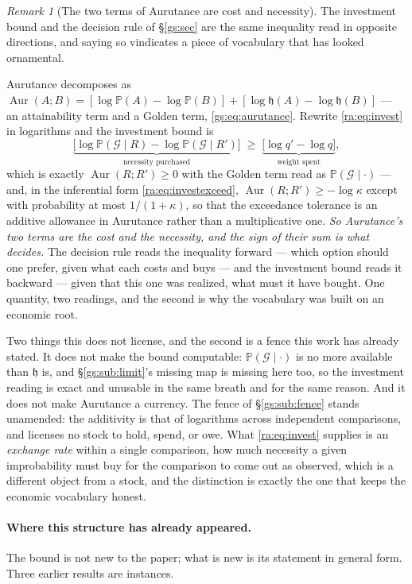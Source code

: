 \documentclass[11pt]{article}
\numberwithin{equation}{section}
\theoremstyle{plain}
\theoremstyle{definition}
\theoremstyle{remark}
\newtheorem{remark}[theorem]{Remark}
\newcommand{\PP}{\mathbb{P}}
\newcommand{\hm}{\mathfrak{h}}
\begin{document}
\begin{remark}[The two terms of Aurutance are cost and necessity]
\label{ra:rem:aurutance}
The investment bound and the decision rule of \S\ref{gs:sec} are the same
inequality read in opposite directions, and saying so vindicates a piece
of vocabulary that has looked ornamental.

Aurutance decomposes as
$\operatorname{Aur}(A;B)=[\log\PP(A)-\log\PP(B)]+[\log\hm(A)-\log\hm(B)]$
--- an attainability term and a Golden term,
\eqref{gs:eq:aurutance}. Rewrite \eqref{ra:eq:invest} in logarithms and
the investment bound is
\[
\underbrace{\bigl[\log\PP(\mathcal G\mid R)-\log\PP(\mathcal G\mid R')\bigr]}
_{\text{necessity purchased}}
\;\ge\;
\underbrace{\bigl[\log q'-\log q\bigr]}_{\text{weight spent}},
\]
which is exactly $\operatorname{Aur}(R;R')\ge0$ with the Golden term read
as $\PP(\mathcal G\mid\cdot)$ --- and, in the inferential form
\eqref{ra:eq:investexceed}, $\operatorname{Aur}(R;R')\ge-\log\kappa$
except with probability at most $1/(1+\kappa)$, so that the exceedance
tolerance is an additive allowance in Aurutance rather than a
multiplicative one. \emph{So Aurutance's two terms are the
cost and the necessity, and the sign of their sum is what decides.} The
decision rule reads the inequality forward --- which option should one
prefer, given what each costs and buys --- and the investment bound reads
it backward --- given that this one was realized, what must it have
bought. One quantity, two readings, and the second is why the vocabulary
was built on an economic root.

Two things this does not license, and the second is a fence this work has
already stated. It does not make the bound computable: $\PP(\mathcal
G\mid\cdot)$ is no more available than $\hm$ is, and
\S\ref{gs:sub:limit}'s missing map is missing here too, so the investment
reading is exact and unusable in the same breath and for the same reason.
And it does not make Aurutance a currency. The fence of
\S\ref{gs:sub:fence} stands unamended: the additivity is that of
logarithms across independent comparisons, and licenses no stock to hold,
spend, or owe. What \eqref{ra:eq:invest} supplies is an
\emph{exchange rate} within a single comparison, how much necessity a
given improbability must buy for the comparison to come out as observed, which is a different object from a stock, and the distinction is
exactly the one that keeps the economic vocabulary honest.
\end{remark}

\paragraph{Where this structure has already appeared.}\label{ra:rem:investinstances}
The bound is not new to the paper; what is new is its statement in
general form. Three earlier results are instances.
\end{document}
